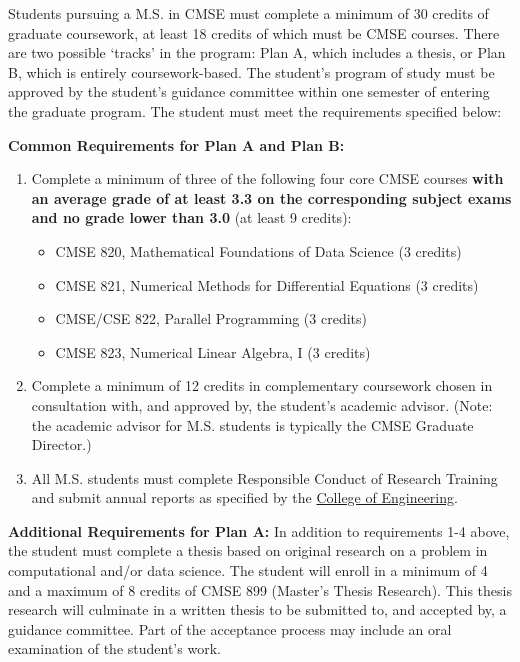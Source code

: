 Students pursuing a M.S. in CMSE must complete a minimum of 30 credits
of graduate coursework, at least 18 credits of which must be CMSE
courses. There are two possible `tracks' in the program: Plan A, which
includes a thesis, or Plan B, which is entirely coursework-based. The
student’s program of study must be approved by the student’s guidance
committee within one semester of entering the graduate program. The
student must meet the requirements specified below:

\vspace{3mm}
\noindent
\textbf{Common Requirements for Plan A and Plan B:}

\begin{enumerate}

\item Complete a minimum of three of the following four core CMSE
  courses \textbf{with an average grade of at least 3.3 on the
    corresponding subject exams and no grade lower than 3.0} (at least
  9 credits):

\begin{itemize}
    \item  CMSE 820, Mathematical Foundations of Data Science (3 credits)  
    \item  CMSE 821, Numerical Methods for Differential Equations (3 credits)  
    \item  CMSE/CSE 822, Parallel Programming (3 credits)  
    \item  CMSE 823, Numerical Linear Algebra, I (3 credits)  
\end{itemize}

\item Complete a minimum of 12 credits in complementary coursework
  chosen in consultation with, and approved by, the student’s academic
  advisor.  (Note: the academic advisor for M.S. students is typically the CMSE Graduate Director.)
 
\item All M.S. students must complete Responsible Conduct of Research
  Training and submit annual reports as specified by the
  \href{https://www.egr.msu.edu/academics/graduate/rcr}{College of
    Engineering}.

\end{enumerate}

\vspace{3mm}
\noindent
\textbf{Additional Requirements for Plan A:} In addition to
requirements 1-4 above, the student must complete a thesis based on
original research on a problem in computational and/or data
science. The student will enroll in a minimum of 4 and a maximum of 8
credits of CMSE 899 (Master’s Thesis Research). This thesis research
will culminate in a written thesis to be submitted to, and accepted
by, a guidance committee. Part of the acceptance process may include
an oral examination of the student’s work.

